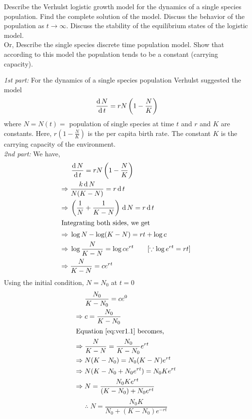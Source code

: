 \documentclass[../main-sheet.tex]{subfiles}
\begin{document}
\begin{prob}
    Describe the Verhulst logistic growth model for the dynamics of a single species population. Find the complete solution of the model. Discuss the behavior of the population as \(t\to \infty\). Discuss the stability of the equilibrium states of the logistic model.\\
    Or, Describe the single species discrete time population model. Show that according to this model the population tends to be a constant (carrying capacity).
\end{prob}
\begin{soln}
    \emph{1st part:} For the dynamics of a single species population Verhulst suggested the model
    \[\,\frac{\mathrm{d}\,N}{\mathrm{d}\,t}=rN\left( 1-\frac{N}{K} \right)\]
    where \(N=N(t)=\) population of single species at time \(t\) and \(r\) and \(K\) are constants. Here, \(r\left( 1-\frac{N}{K} \right)\) is the per capita birth rate. The constant \(K\) is the carrying capacity of the environment.\\
    
    \emph{2nd part:} We have,
    \begin{align}
        &\,\frac{\mathrm{d}\,N}{\mathrm{d}\,t}=rN\left( 1-\frac{N}{K} \right)\notag\\
        \Rightarrow\; &\frac{k\,\mathrm{d}\, N}{N(K-N)}=r\,\mathrm{d}\, t\notag\\
        \Rightarrow\; &\left(\frac{1}{N}+\frac{1}{K-N}\right)\,\mathrm{d}\, N=r\,\mathrm{d}\, t\notag\\
        \intertext{Integrating both sides, we get}
        \Rightarrow\; &\log N-\log(K-N)=rt+\log c\notag\\
        \Rightarrow\; &\log \frac{N}{K-N}=\log c e^{rt}\qquad [\because \log e^{rt}=rt]\notag\\
        \Rightarrow\; &\frac{N}{K-N}=c e^{rt}\label{eq:ver1.1}
    \end{align}
    Using the initial condition, \(N=N_0\) at \(t=0\)
    \begin{align*}
        &\frac{N_0}{K-N_0}=ce^0\\
        \Rightarrow\; &c=\frac{N_0}{K-N_0}\\
        \intertext{Equation \eqref{eq:ver1.1} becomes,}
        \Rightarrow\; &\frac{N}{K-N}=\frac{N_0}{K-N_0}e^{rt}\\
        \Rightarrow\; &N(K-N_0)=N_0(K-N)e^{rt}\\
        \Rightarrow\; &N(K-N_0+N_0e^{rt})=N_0Ke^{rt}\\
        \Rightarrow\; & N=\frac{N_0Ke^{rt}}{(K-N_0)+N_0e^{rt}}
    \end{align*}
    \begin{equation}
        \therefore\;N=\frac{N_0K}{N_0+(K-N_0)e^{-rt}} \label{eq:ver1.2}
    \end{equation}
    

\end{soln}
\end{document}
